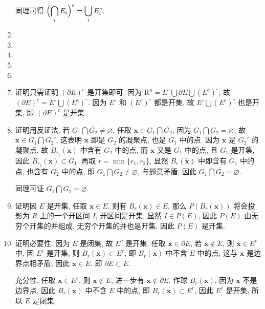 \documentclass[a4paper, 11pt]{ctexart}
\begin{document}
\begin{enumerate}
        同理可得 $\displaystyle{\Bigl(\bigcap_i E_i\Bigr)^c = \bigcup_i E_i^c}$.
    \item %
    \item %
    \item %
    \item %
    \item %
    \item %
        {\heiti 证明}\quad 只需证明 $(\partial{E})^c$ 是开集即可. 因为 $\mathrm{R}^n = E^\circ \bigcup \partial{E} \bigcup (E^c)^\circ$,
        故 $(\partial{E})^c = E^\circ \bigcup (E^c)^\circ$. 因为 $E^\circ$ 和 $(E^c)^\circ$ 都是开集, 故 $E^\circ \bigcup (E^c)^\circ$ 也是开集,
        即 $(\partial{E})^c$ 是开集.
    \item %
        {\heiti 证明}\quad 用反证法. 若 $G_1 \bigcap \overline{G_2} \neq \varnothing$, 任取 $\boldsymbol{x} \in G_1 \bigcap \overline{G_2}$, 因为 $G_1 \bigcap G_2 = \varnothing$,
        故 $\boldsymbol{x} \in G_1 \bigcap G_2'$, 这表明 $\boldsymbol{x}$ 即是 $G_2$ 的凝聚点, 也是 $G_1$ 中的点.
        因为 $\boldsymbol{x}$ 是 $G_2'$ 的凝聚点, 故 $B_{r_1}(\check{\boldsymbol{x}})$ 中含有 $G_2$ 中的点, 而 $\boldsymbol{x}$ 又是 $G_1$ 中的点,
        且 $G_1$ 是开集, 因此 $B_{r_2}(\boldsymbol{x}) \subset G_1$. 再取 $r = \min\{r_1, r_2\}$, 显然 $B_r(\check{\boldsymbol{x}})$ 中即含有 $G_1$ 中的点, 也含有 $G_2$ 中的点,
        即 $G_1 \bigcap G_2 \neq \varnothing$, 与题意矛盾, 因此 $G_1 \bigcap \overline{G_2} = \varnothing$.

        同理可证 $\overline{G_1} \bigcap G_2 = \varnothing$.
    \item %
        {\heiti 证明}\quad 因 $E$ 是开集, 任取 $\boldsymbol{x} \in E$, 则有 $B_r(\boldsymbol{x}) \in E$,
        那么 $P(B_r(\boldsymbol{x}))$ 将会投影为 $R$ 上的一个开区间 $I$, 开区间是开集, 显然 $I \in P(E)$, 因此 $P(E)$ 由无穷个开集的并组成.
        无穷个开集的并也是开集, 因此 $P(E)$ 是开集.
    \item %
        {\heiti 证明}\quad 必要性. 因为 $E$ 是闭集, 故 $E^c$ 是开集. 任取 $\boldsymbol{x} \in \partial{E}$, 若 $\boldsymbol{x} \notin E$,
        则 $\boldsymbol{x} \in E^c$ 中, 因 $E^c$ 是开集, 则 $B_r(\boldsymbol{x}) \subset E^c$, 即 $B_r(\boldsymbol{x})$ 中不含 $E$ 中的点,
        这与 $\boldsymbol{x}$ 是边界点相矛盾, 因此 $\boldsymbol{x} \in E$. 即 $\partial{E} \subset E$.
        
        充分性. 任取 $\boldsymbol{x} \in E^c$, 则 $\boldsymbol{x} \notin E$, 进一步有 $\boldsymbol{x} \notin \partial{E}$.
        作球 $B_r(\boldsymbol{x})$, 因为 $\boldsymbol{x}$ 不是边界点, 因此 $B_r(\boldsymbol{x})$ 中不含 $E$ 中的点, 即 $B_r(\boldsymbol{x}) \subset E^c$,
        因此 $E^c$ 是开集, 所以 $E$ 是闭集.
\end{enumerate}
\end{document}

